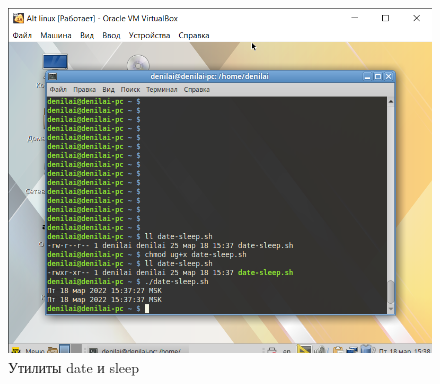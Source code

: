 \documentclass[a4paper,14pt]{extarticle}
\begin{document}
\begin{figure}[h!]
	\centering
	\includegraphics[width=0.7\linewidth]{"images/Практика МИРЭА/Alt linux [Работает] - Oracle VM VirtualBox 18.03.2022 15_38_09"}
	\caption{Утилиты date и sleep}
	\label{fig:date-sleep}
\end{figure}
\end{document}
